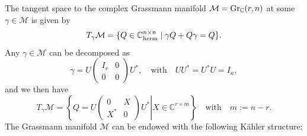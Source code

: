 \documentclass[11pt]{article}
\def\C{{\mathbb C}}
\begin{document}
The tangent space to the complex Grassmann manifold $\mathcal M= {\rm Gr}_\C(r,n)$ at some $\gamma \in \mathcal M$ is given by
$$
T_\gamma\mathcal M= \{Q \in \C^{n \times n}_{\rm herm} \; | \; \gamma Q + Q \gamma = Q \}.
$$
Any $\gamma \in \mathcal M$ can be decomposed as
$$
\gamma = U \left( \begin{array}{cc} I_r & 0 \\ 0 & 0 \end{array} \right) U^*, \quad \mbox{with} \quad UU^*=U^*U=I_{n},
$$
and we then have
\begin{equation}\label{eq:TgammaM}
T_\gamma\mathcal M= \left\{\left.Q=U \left( \begin{array}{cc} 0 & X \\ X^* & 0 \end{array} \right) U^*\right|X \in \C^{r \times m} \right\} \quad \mbox{with} \quad m:=n-r.
\end{equation}
The Grassmann manifold $\mathcal M$ can be endowed with the following K\"ahler structure:
\end{document}

